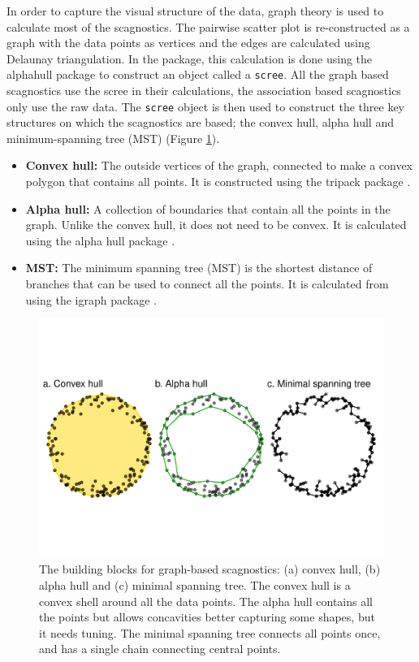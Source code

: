 In order to capture the visual structure of the data, graph theory is
used to calculate most of the scagnostics. The pairwise scatter plot is
re-constructed as a graph with the data points as vertices and the edges
are calculated using Delaunay triangulation. In the package, this
calculation is done using the alphahull package \citep{alphahull} to
construct an object called a \texttt{scree}. All the graph based
scagnostics use the scree in their calculations, the association based
scagnostics only use the raw data. The \texttt{scree} object is then
used to construct the three key structures on which the scagnostics are
based; the convex hull, alpha hull and minimum-spanning tree (MST)
(Figure \ref{fig:building-blocks2}).

\begin{itemize}
\item
  \textbf{Convex hull:} The outside vertices of the graph, connected to
  make a convex polygon that contains all points. It is constructed
  using the tripack package \citep{tripack}.
\item
  \textbf{Alpha hull:} A collection of boundaries that contain all the
  points in the graph. Unlike the convex hull, it does not need to be
  convex. It is calculated using the alpha hull package
  \citep{alphahull}.
\item
  \textbf{MST:} The minimum spanning tree (MST) is the shortest distance
  of branches that can be used to connect all the points. It is
  calculated from using the igraph package \citep{igraph}.
\end{itemize}

\begin{Schunk}
\begin{figure}
\includegraphics[width=1\linewidth]{mason-lee-laa-cook_files/figure-latex/building-blocks2-1} \caption[The building blocks for graph-based scagnostics]{The building blocks for graph-based scagnostics: (a) convex hull, (b) alpha hull and (c) minimal spanning tree. The convex hull is a convex shell around all the data points. The alpha hull contains all the points but allows concavities better capturing some shapes, but it needs tuning. The minimal spanning tree connects all points once, and has a single chain connecting central points.}\label{fig:building-blocks2}
\end{figure}
\end{Schunk}

